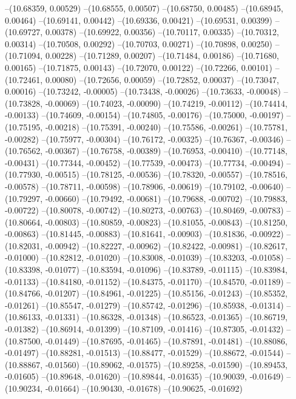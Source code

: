 --(10.68359, 0.00529)
--(10.68555, 0.00507)
--(10.68750, 0.00485)
--(10.68945, 0.00464)
--(10.69141, 0.00442)
--(10.69336, 0.00421)
--(10.69531, 0.00399)
--(10.69727, 0.00378)
--(10.69922, 0.00356)
--(10.70117, 0.00335)
--(10.70312, 0.00314)
--(10.70508, 0.00292)
--(10.70703, 0.00271)
--(10.70898, 0.00250)
--(10.71094, 0.00228)
--(10.71289, 0.00207)
--(10.71484, 0.00186)
--(10.71680, 0.00165)
--(10.71875, 0.00143)
--(10.72070, 0.00122)
--(10.72266, 0.00101)
--(10.72461, 0.00080)
--(10.72656, 0.00059)
--(10.72852, 0.00037)
--(10.73047, 0.00016)
--(10.73242, -0.00005)
--(10.73438, -0.00026)
--(10.73633, -0.00048)
--(10.73828, -0.00069)
--(10.74023, -0.00090)
--(10.74219, -0.00112)
--(10.74414, -0.00133)
--(10.74609, -0.00154)
--(10.74805, -0.00176)
--(10.75000, -0.00197)
--(10.75195, -0.00218)
--(10.75391, -0.00240)
--(10.75586, -0.00261)
--(10.75781, -0.00282)
--(10.75977, -0.00304)
--(10.76172, -0.00325)
--(10.76367, -0.00346)
--(10.76562, -0.00367)
--(10.76758, -0.00389)
--(10.76953, -0.00410)
--(10.77148, -0.00431)
--(10.77344, -0.00452)
--(10.77539, -0.00473)
--(10.77734, -0.00494)
--(10.77930, -0.00515)
--(10.78125, -0.00536)
--(10.78320, -0.00557)
--(10.78516, -0.00578)
--(10.78711, -0.00598)
--(10.78906, -0.00619)
--(10.79102, -0.00640)
--(10.79297, -0.00660)
--(10.79492, -0.00681)
--(10.79688, -0.00702)
--(10.79883, -0.00722)
--(10.80078, -0.00742)
--(10.80273, -0.00763)
--(10.80469, -0.00783)
--(10.80664, -0.00803)
--(10.80859, -0.00823)
--(10.81055, -0.00843)
--(10.81250, -0.00863)
--(10.81445, -0.00883)
--(10.81641, -0.00903)
--(10.81836, -0.00922)
--(10.82031, -0.00942)
--(10.82227, -0.00962)
--(10.82422, -0.00981)
--(10.82617, -0.01000)
--(10.82812, -0.01020)
--(10.83008, -0.01039)
--(10.83203, -0.01058)
--(10.83398, -0.01077)
--(10.83594, -0.01096)
--(10.83789, -0.01115)
--(10.83984, -0.01133)
--(10.84180, -0.01152)
--(10.84375, -0.01170)
--(10.84570, -0.01189)
--(10.84766, -0.01207)
--(10.84961, -0.01225)
--(10.85156, -0.01243)
--(10.85352, -0.01261)
--(10.85547, -0.01279)
--(10.85742, -0.01296)
--(10.85938, -0.01314)
--(10.86133, -0.01331)
--(10.86328, -0.01348)
--(10.86523, -0.01365)
--(10.86719, -0.01382)
--(10.86914, -0.01399)
--(10.87109, -0.01416)
--(10.87305, -0.01432)
--(10.87500, -0.01449)
--(10.87695, -0.01465)
--(10.87891, -0.01481)
--(10.88086, -0.01497)
--(10.88281, -0.01513)
--(10.88477, -0.01529)
--(10.88672, -0.01544)
--(10.88867, -0.01560)
--(10.89062, -0.01575)
--(10.89258, -0.01590)
--(10.89453, -0.01605)
--(10.89648, -0.01620)
--(10.89844, -0.01635)
--(10.90039, -0.01649)
--(10.90234, -0.01664)
--(10.90430, -0.01678)
--(10.90625, -0.01692)
